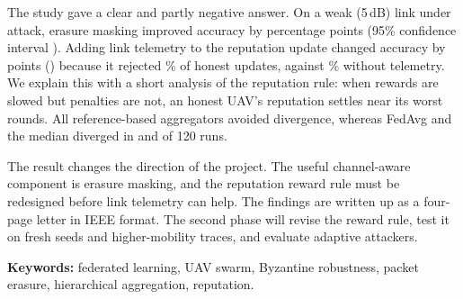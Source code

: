 The study gave a clear and partly negative answer. On a weak (5\,dB) link under
attack, erasure masking improved accuracy by \MaskGain{} percentage points (95\%
confidence interval \ci{\MaskLo}{\MaskHi}). Adding link telemetry to the reputation
update changed accuracy by \TelGain{} points (\ci{\TelLo}{\TelHi}) because it
rejected \RejCcra\% of honest updates, against \RejMask\% without telemetry. We
explain this with a short analysis of the reputation rule: when rewards are slowed
but penalties are not, an honest UAV's reputation settles near its worst rounds. All
reference-based aggregators avoided divergence, whereas FedAvg and the median
diverged in \DivFedavg{} and \DivMedian{} of 120 runs.

The result changes the direction of the project. The useful channel-aware component
is erasure masking, and the reputation reward rule must be redesigned before link
telemetry can help. The findings are written up as a four-page letter in IEEE format.
The second phase will revise the reward rule, test it on fresh seeds and
higher-mobility traces, and evaluate adaptive attackers.

\vspace{6mm}
\noindent\textbf{Keywords:} federated learning, UAV swarm, Byzantine robustness,
packet erasure, hierarchical aggregation, reputation.
